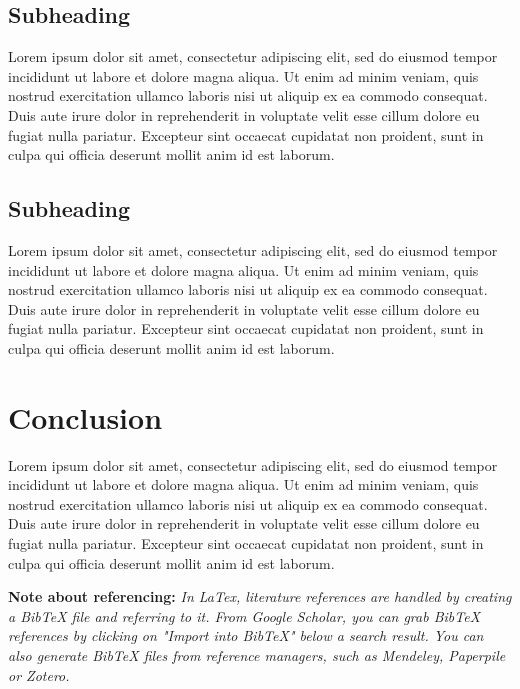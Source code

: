 \documentclass[11pt]{report}
\begin{document}
\section{Subheading}

Lorem ipsum dolor sit amet, consectetur adipiscing elit, sed do eiusmod tempor incididunt ut labore et dolore magna aliqua. Ut enim ad minim veniam, quis nostrud exercitation ullamco laboris nisi ut aliquip ex ea commodo consequat. Duis aute irure dolor in reprehenderit in voluptate velit esse cillum dolore eu fugiat nulla pariatur. Excepteur sint occaecat cupidatat non proident, sunt in culpa qui officia deserunt mollit anim id est laborum.

\section{Subheading}

Lorem ipsum dolor sit amet, consectetur adipiscing elit, sed do eiusmod tempor incididunt ut labore et dolore magna aliqua. Ut enim ad minim veniam, quis nostrud exercitation ullamco laboris nisi ut aliquip ex ea commodo consequat. Duis aute irure dolor in reprehenderit in voluptate velit esse cillum dolore eu fugiat nulla pariatur. Excepteur sint occaecat cupidatat non proident, sunt in culpa qui officia deserunt mollit anim id est laborum.

\chapter{Conclusion}

Lorem ipsum dolor sit amet, consectetur adipiscing elit, sed do eiusmod tempor incididunt ut labore et dolore magna aliqua. Ut enim ad minim veniam, quis nostrud exercitation ullamco laboris nisi ut aliquip ex ea commodo consequat. Duis aute irure dolor in reprehenderit in voluptate velit esse cillum dolore eu fugiat nulla pariatur. Excepteur sint occaecat cupidatat non proident, sunt in culpa qui officia deserunt mollit anim id est laborum.

\textbf{Note about referencing:} \textit{In LaTex, literature references are handled by creating a BibTeX file and referring to it. From Google Scholar, you can grab BibTeX references by clicking on "Import into BibTeX" below a search result. You can also generate BibTeX files from reference managers, such as Mendeley, Paperpile or Zotero.}


\end{document}
